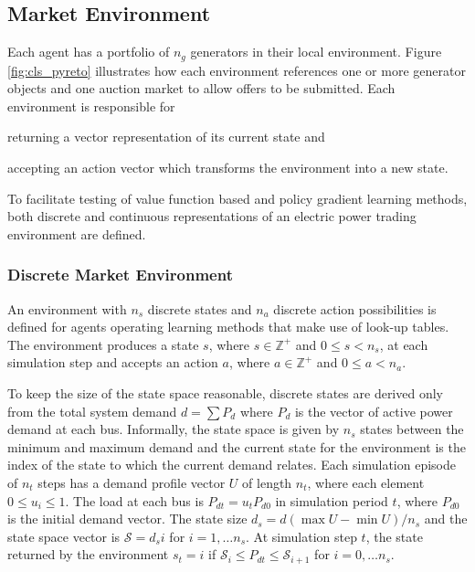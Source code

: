 \subsection{Market Environment}
Each agent has a portfolio of $n_g$ generators in their local environment.
Figure \ref{fig:cls_pyreto} illustrates how each environment references one or
more generator objects and one auction market to allow offers to be submitted.
Each environment is responsible for \begin{inparaenum}[(i)] \item returning a
vector representation of its current state and \item accepting an action vector
which transforms the environment into a new state. \end{inparaenum}  To
facilitate testing of value function based and policy gradient learning methods,
both discrete and continuous representations of an electric power trading
environment are defined.


\subsubsection{Discrete Market Environment}
An environment with $n_s$ discrete states and $n_a$ discrete action
possibilities is defined for agents operating learning methods that make use of
look-up tables. The environment produces a state $s$, where $s \in \mathbb{Z}^+$
and $0\leq s < n_s$, at each simulation step and accepts an action $a$, where $a
\in \mathbb{Z}^+$ and $0\leq a < n_a$.

To keep the size of the state space reasonable, discrete states are derived only
from the total system demand $d=\sum P_d$ where $P_d$ is the vector of active
power demand at each bus.  Informally, the state space is given by $n_s$ states
between the minimum and maximum demand and the current state for the environment
is the index of the state to which the current demand relates.  Each simulation
episode of $n_t$ steps has a demand profile vector $U$ of length $n_t$, where
each element $0 \leq u_i \leq 1$. The load at each bus is $P_{dt} = u_tP_{d0}$
in simulation period $t$, where $P_{d0}$ is the initial demand vector.  The
state size $d_s = d(\max U - \min U)/n_s$ and the state space vector is
$\mathscr{S}=d_si$ for $i=1,\dotsc n_s$. At simulation step $t$, the state
returned by the environment $s_t = i$ if $\mathscr{S}_i \leq P_{dt} \leq
\mathscr{S}_{i+1}$ for $i = 0,\dotsc n_s$.


